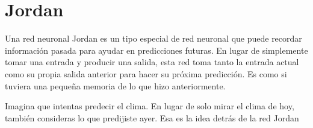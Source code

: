\documentclass[
]{book}
\begin{document}
\hypertarget{jordan}{%
\chapter{Jordan}\label{jordan}}

Una red neuronal Jordan es un tipo especial de red neuronal que puede recordar información pasada para ayudar en predicciones futuras. En lugar de simplemente tomar una entrada y producir una salida, esta red toma tanto la entrada actual como su propia salida anterior para hacer su próxima predicción. Es como si tuviera una pequeña memoria de lo que hizo anteriormente.

Imagina que intentas predecir el clima. En lugar de solo mirar el clima de hoy, también consideras lo que predijiste ayer. Esa es la idea detrás de la red Jordan
\end{document}
